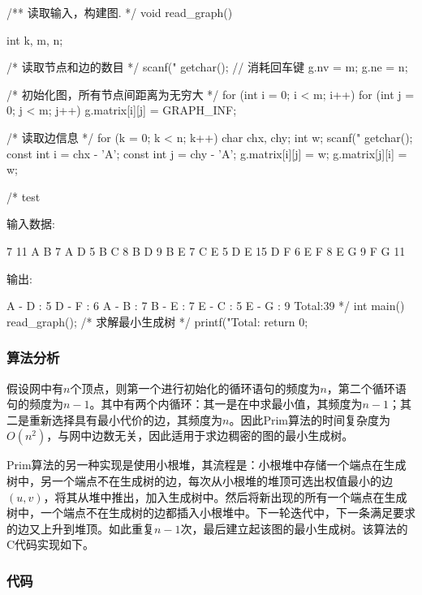 \begin{Codex}[label=mgraph_prim1.cpp]
/** 读取输入，构建图. */
void read_graph() {
    int k, m, n;

    /* 读取节点和边的数目 */
    scanf("%
    getchar(); // 消耗回车键
    g.nv = m;
    g.ne = n;

    /* 初始化图，所有节点间距离为无穷大 */
    for (int i = 0; i < m; i++) {
        for (int j = 0; j < m; j++) {
            g.matrix[i][j] = GRAPH_INF;
        }
    }

    /* 读取边信息 */
    for (k = 0; k < n; k++) {
        char chx, chy;
        int w;
        scanf("%
        getchar();
        const int i = chx - 'A';
        const int j = chy - 'A';
        g.matrix[i][j] = w;
        g.matrix[j][i] = w;
    }
}

/* test

输入数据:

7 11
A B 7
A D 5
B C 8
B D 9
B E 7
C E 5
D E 15
D F 6
E F 8
E G 9
F G 11

输出:

A - D : 5
D - F : 6
A - B : 7
B - E : 7
E - C : 5
E - G : 9
Total:39
*/
int main() {
    read_graph();
    /* 求解最小生成树 */
    printf("Total:%
    return 0;
}
\end{Codex}

\subsubsection{算法分析}
假设网中有$n$个顶点，则第一个进行初始化的循环语句的频度为$n$，第二个循环语句的频度为$n-1$。其中有两个内循环：其一是在中求最小值，其频度为$n-1$；其二是重新选择具有最小代价的边，其频度为$n$。因此Prim算法的时间复杂度为$O(n^2)$，与网中边数无关，因此适用于求边稠密的图的最小生成树。

Prim算法的另一种实现是使用小根堆，其流程是：小根堆中存储一个端点在生成树中，另一个端点不在生成树的边，每次从小根堆的堆顶可选出权值最小的边$(u, v)$，将其从堆中推出，加入生成树中。然后将新出现的所有一个端点在生成树中，一个端点不在生成树的边都插入小根堆中。下一轮迭代中，下一条满足要求的边又上升到堆顶。如此重复$n-1$次，最后建立起该图的最小生成树。该算法的C代码实现如下。

\subsubsection{代码}

